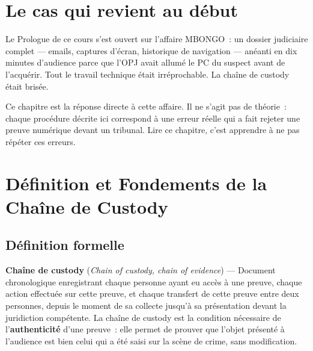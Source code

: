 \bigskip

\section*{Le cas qui revient au début}

Le Prologue de ce cours s'est ouvert sur l'affaire MBONGO~: un dossier
judiciaire complet --- emails, captures d'écran, historique de navigation ---
anéanti en dix minutes d'audience parce que l'OPJ avait allumé le PC du suspect
avant de l'acquérir. Tout le travail technique était irréprochable. La chaîne
de custody était brisée.

Ce chapitre est la réponse directe à cette affaire. Il ne s'agit pas de
théorie~: chaque procédure décrite ici correspond à une erreur réelle qui
a fait rejeter une preuve numérique devant un tribunal. Lire ce chapitre,
c'est apprendre à ne pas répéter ces erreurs.

\separateur

\section{Définition et Fondements de la Chaîne de Custody}
\label{sec:custody-fondements}

\subsection{Définition formelle}

\begin{boxdef}
\textbf{Chaîne de custody}
(\textit{Chain of custody, chain of evidence}) --- Document chronologique
enregistrant chaque personne ayant eu accès à une preuve, chaque action
effectuée sur cette preuve, et chaque transfert de cette preuve entre
deux personnes, depuis le moment de sa collecte jusqu'à sa présentation
devant la juridiction compétente. La chaîne de custody est la condition
nécessaire de l'\textbf{authenticité} d'une preuve~: elle permet de prouver
que l'objet présenté à l'audience est bien celui qui a été saisi sur la
scène de crime, sans modification.
\end{boxdef}

